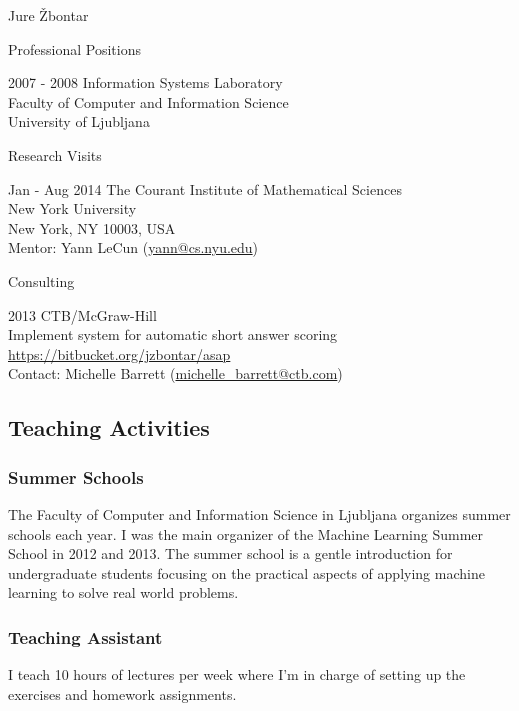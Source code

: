 \documentclass[12pt,a4paper]{article}
\begin{document}
\begin{cv}{Jure \v{Z}bontar}
\begin{cvlist}{Professional Positions}
\item[2007 - 2008] Information Systems Laboratory \\
Faculty of Computer and Information Science \\
University of Ljubljana

\end{cvlist}

\begin{cvlist}{Research Visits}
\item[Jan - Aug 2014] The Courant Institute of Mathematical Sciences \\
New York University \\
New York, NY 10003, USA \\
Mentor: Yann LeCun (\href{mailto:yann@cs.nyu.edu}{yann@cs.nyu.edu})
\end{cvlist}

\begin{cvlist}{Consulting}
\item[2013] CTB/McGraw-Hill \\
Implement system for automatic short answer scoring \\
\url{https://bitbucket.org/jzbontar/asap} \\
Contact: Michelle Barrett (\href{mailto:michelle_barrett@ctb.com}{michelle\_barrett@ctb.com})
\end{cvlist}


\subsection*{Teaching Activities}

\subsubsection*{Summer Schools}
The Faculty of Computer and Information Science in Ljubljana organizes
summer schools each year. I was the main organizer of the Machine Learning
Summer School in 2012 and 2013. The summer school is a gentle introduction
for undergraduate students focusing on the practical aspects of applying
machine learning to solve real world problems.

\subsubsection*{Teaching Assistant}
I teach 10 hours of lectures per week where I'm in charge of setting up the
exercises and homework assignments.


\end{cv}
\end{document}
